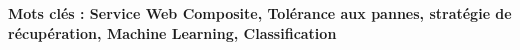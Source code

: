 \documentclass[a4paper,12pt]{book}
\theoremstyle{break}
\begin{document}
\textbf{Mots clés : Service Web Composite, Tolérance aux pannes, stratégie de récupération, Machine Learning, Classification }


\tableofcontents
\listoffigures

\mainmatter
\pagestyle{fancy}








\appendix




\end{document}
